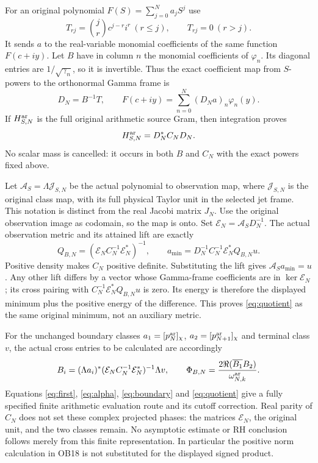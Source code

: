 \documentclass[11pt]{article}
\begin{document}
For an original polynomial $F(S)=\sum_{j=0}^N a_jS^j$ use
\[
 T_{rj}=\binom jr c^{j-r}i^r\ (r\le j),\qquad T_{rj}=0\ (r>j).
\]
It sends $a$ to the real-variable monomial coefficients of the same
function $F(c+iy)$. Let $B$ have in column $n$ the monomial
coefficients of $\varphi_n$. Its diagonal entries are
$1/\sqrt{\gamma_n}$, so it is invertible. Thus the exact coefficient
map from $S$-powers to the orthonormal Gamma frame is
\[
 D_N=B^{-1}T,\qquad F(c+iy)=\sum_{n=0}^N(D_Na)_n\varphi_n(y).
\]
If $H_{S,N}^{\rm ar}$ is the full original arithmetic source Gram,
then integration proves
\begin{equation}\label{eq:sourcegram}
 H_{S,N}^{\rm ar}=D_N^*C_ND_N.
\end{equation}
No scalar mass is cancelled: it occurs in both $B$ and $C_N$ with
the exact powers fixed above.

Let $\mathcal A_S=\Lambda\mathcal J_{S,N}$ be the actual polynomial
to observation map, where $\mathcal J_{S,N}$ is the original class
map, with its full physical Taylor unit in the selected jet frame.
This notation is distinct from the real Jacobi matrix $J_N$.
Use the original observation image as codomain, so the map is onto.
Set $\mathcal E_N=\mathcal A_SD_N^{-1}$. The actual observation
metric and its attained lift are exactly
\begin{equation}\label{eq:quotient}
 \boxed{Q_{B,N}=(\mathcal E_N C_N^{-1}\mathcal E_N^*)^{-1},
 \qquad a_{\min}=D_N^{-1}C_N^{-1}\mathcal E_N^*Q_{B,N}u.}
\end{equation}
Positive density makes $C_N$ positive definite. Substituting the lift
gives $\mathcal A_Sa_{\min}=u$. Any other lift differs by a vector
whose Gamma-frame coefficients are in $\ker\mathcal E_N$; its
cross pairing with $C_N^{-1}\mathcal E_N^*Q_{B,N}u$ is zero.
Its energy is therefore the displayed minimum plus the positive
energy of the difference. This proves \eqref{eq:quotient} as the
same original minimum, not an auxiliary metric.

For the unchanged boundary classes $a_1=[p_N^{\rm ar}]_\chi$,
$a_2=[p_{N+1}^{\rm ar}]_\chi$ and terminal class $v$, the actual
cross entries to be calculated are accordingly
\[
 B_i=(\Lambda a_i)^*(\mathcal E_N C_N^{-1}\mathcal E_N^*)^{-1}
              \Lambda v,\qquad
 \Phi_{B,N}=\frac{2\Re(\overline{B_1}B_2)}{\omega_{N,k}^{\rm ar}}.
\]
Equations \eqref{eq:first}, \eqref{eq:alpha}, \eqref{eq:boundary}
and \eqref{eq:quotient} give a fully specified finite arithmetic
evaluation route and its cutoff correction. Real parity of $C_N$
does not set these complex projected phases: the matrices
$\mathcal E_N$, the original unit, and the two classes remain.
No asymptotic estimate or RH conclusion follows merely from this
finite representation. In particular the positive norm calculation
in OB18 is not substituted for the displayed signed product.
\end{document}
